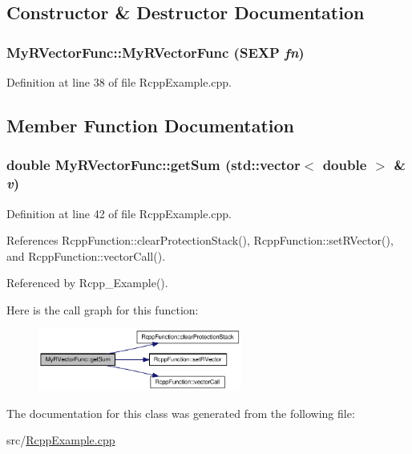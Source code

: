 \subsection{Constructor \& Destructor Documentation}
\hypertarget{classMyRVectorFunc_dc09bab76bddb0c246ed98c942fd4cd8}{
\subsubsection[MyRVectorFunc]{\setlength{\rightskip}{0pt plus 5cm}MyRVectorFunc::MyRVectorFunc (SEXP {\em fn})}}
\label{classMyRVectorFunc_dc09bab76bddb0c246ed98c942fd4cd8}




Definition at line 38 of file RcppExample.cpp.

\subsection{Member Function Documentation}
\hypertarget{classMyRVectorFunc_2eba5a390ca620a687e77208bfbb6df4}{
\subsubsection[getSum]{\setlength{\rightskip}{0pt plus 5cm}double MyRVectorFunc::getSum (std::vector$<$ double $>$ \& {\em v})}}
\label{classMyRVectorFunc_2eba5a390ca620a687e77208bfbb6df4}




Definition at line 42 of file RcppExample.cpp.

References RcppFunction::clearProtectionStack(), RcppFunction::setRVector(), and RcppFunction::vectorCall().

Referenced by Rcpp\_\-Example().

Here is the call graph for this function:\nopagebreak
\begin{figure}[H]
\begin{center}
\leavevmode
\includegraphics[width=190pt]{classMyRVectorFunc_2eba5a390ca620a687e77208bfbb6df4_cgraph}
\end{center}
\end{figure}


The documentation for this class was generated from the following file:\begin{CompactItemize}
\item 
src/\hyperlink{RcppExample_8cpp}{RcppExample.cpp}\end{CompactItemize}

